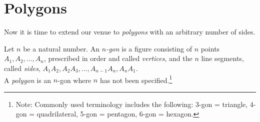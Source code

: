 \chapter{Polygons}
Now it is time to extend our venue to \emph{polygons} with an arbitrary number of sides.

\begin{definition}\label{defn:n-gon}
Let $n$ be a natural number. An \emph{$n$-gon} is a figure consisting of $n$ points $A_1, A_2, \ldots, A_n$, prescribed in order and called \emph{vertices}, and the $n$ line segments, called \emph{sides}, $A_1A_2, A_2A_3, \ldots, A_{n-1}A_n, A_nA_1$.\\
A \emph{polygon} is an $n$-gon where $n$ has not been specified.\footnote{Note: Commonly used terminology includes the following: 3-gon = triangle, 4-gon = quadrilateral, 5-gon = pentagon, 6-gon = hexagon.}
\end{definition}

